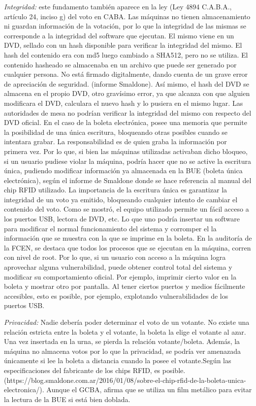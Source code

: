 \textit{Integridad:} este fundamento también aparece en la ley (Ley 4894 C.A.B.A., artículo 24, inciso g) del voto en CABA. Las máquinas no tienen almacenamiento ni guardan información de la votación, por lo que la integridad de las mismas se corresponde a la integridad del software que ejecutan. El mismo viene en un DVD, sellado con un hash disponible para verificar la integridad del mismo. El hash del contenido era con md5 luego cambiado a SHA512, pero no se utiliza. El contenido hasheado se almacenaba en un archivo que puede ser generado por cualquier persona. No está firmado digitalmente, dando cuenta de un grave error de apreciación de seguridad. (informe Smaldone). Así mismo, el hash del DVD se almacena en el propio DVD, otro gravísimo error, ya que alcanza con que alguien modificara el DVD, calculara el nuevo hash y lo pusiera en el mismo lugar. Las autoridades de mesa no podrían verificar la integridad del mismo con respecto del DVD oficial.
En el caso de la boleta electrónica, posee una memoria que permite la posibilidad de una única escritura, bloqueando otras posibles cuando se intentara grabar. La responsabilidad es de quien graba la información por primera vez. Por lo que, si bien las máquinas utilizadas activaban dicho bloqueo, si un usuario pudiese violar la máquina, podría hacer que no se active la escritura única, pudiendo modificar información ya almacenada en la BUE (boleta única electrónica), según el informe de Smaldone donde se hace referencia al manual del chip RFID utilizado. La importancia de la escritura única es garantizar la integridad de un voto ya emitido, bloqueando cualquier intento de cambiar el contenido del voto.
Como se mostró, el equipo utilizado permite un fácil acceso a los puertos USB, lectora de DVD, etc. Lo que uno podría insertar un software para modificar el normal funcionamiento del sistema y corromper el la información que se muestra con la que se imprime en la boleta.
En la auditoría de la FCEN, se destaca que todos los procesos que se ejecutan en la máquina, corren con nivel de root. Por lo que, si un usuario con acceso a la máquina logra aprovechar alguna vulnerabilidad, puede obtener control total del sistema y modificar su comportamiento oficial. Por ejemplo, imprimir cierto valor en la boleta y mostrar otro por pantalla. Al tener ciertos puertos y medios fácilmente accesibles, esto es posible, por ejemplo, explotando vulnerabilidades de los puertos USB.

\textit{Privacidad:} Nadie debería poder determinar el voto de un votante. No existe una relación estricta entre la boleta y el votante, la boleta la elige el votante al azar. Una vez insertada en la urna, se pierda la relación votante/boleta. Además, la máquina no almacena votos por lo que la privacidad, se podría ver amenazada únicamente si lee la boleta a distancia cuando la posee el votante.Según las especificaciones del fabricante de los chips RFID, es posible. (https://blog.smaldone.com.ar/2016/01/08/sobre-el-chip-rfid-de-la-boleta-unica-electronica/). Aunque el GCBA, afirma que se utiliza un film metálico para evitar la lectura de la BUE si está bien doblada.

